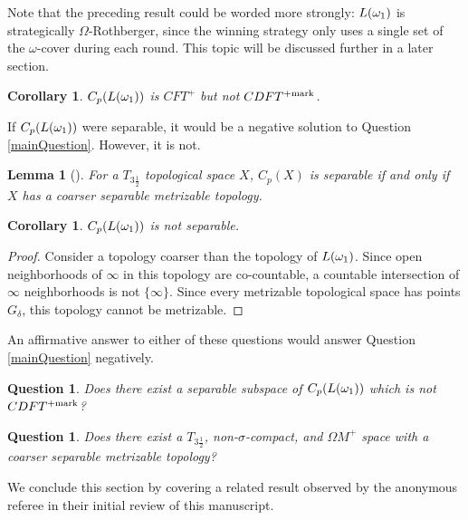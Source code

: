 \documentclass{amsart}
\theoremstyle{plain}
\newtheorem{lemma}[theorem]{Lemma}
\newtheorem{corollary}[theorem]{Corollary}
\newtheorem{question}[theorem]{Question}
\theoremstyle{definition}
\theoremstyle{remark}
\theoremstyle{plain}
\theoremstyle{definition}
\theoremstyle{remark}
\begin{document}
Note that the preceding result could be worded more strongly:
\(L(\omega_1)\)
is strategically \(\Omega\)-Rothberger, since the winning strategy only
uses a single set of the \(\omega\)-cover during each round.
This topic will be discussed further in a later section.

\begin{corollary}
  \(C_p(L(\omega_1))\) is \(CFT^+\) but not \(CDFT^{+\mathrm{mark}}\).
\end{corollary}

If \(C_p(L(\omega_1))\) were separable, it would be a negative
solution to Question \ref{mainQuestion}. However, it is not.

\begin{lemma}[\cite{MR953314}]
  For a \(T_{3\frac{1}{2}}\) topological space \(X\),
  \(C_p(X)\) is separable if and only if \(X\) has a coarser separable
  metrizable topology.
\end{lemma}

\begin{corollary}
  \(C_p(L(\omega_1))\) is not separable.
\end{corollary}

\begin{proof}
  Consider a topology coarser than the topology of \(L(\omega_1)\).
  Since open neighborhoods of \(\infty\) in this topology are co-countable,
  a countable intersection of \(\infty\) neighborhoods is not
  \(\{\infty\}\). Since every metrizable topological space has points
  \(G_\delta\), this topology cannot be metrizable.
\end{proof}

An affirmative answer to either of these questions would answer
Question \ref{mainQuestion} negatively.

\begin{question}
  Does there exist a separable subspace of \(C_p(L(\omega_1))\)
  which is not \(CDFT^{+\mathrm{mark}}\)?
\end{question}

\begin{question}
  Does there exist a \(T_{3\frac{1}{2}}\),
  non-\(\sigma\)-compact, and \(\Omega M^+\) space
  with a coarser separable metrizable topology?
\end{question}


We conclude this section by covering a related result observed by the
anonymous referee in their initial review of this manuscript.
\end{document}

